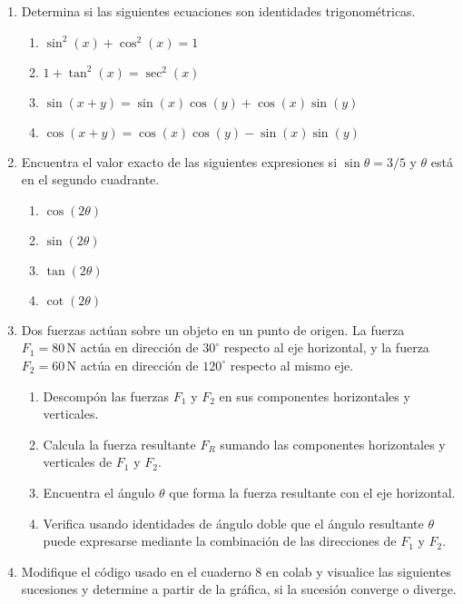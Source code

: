 \documentclass[a4paper,11pt]{article}
\theoremstyle{mytheor}
\begin{document}
\begin{enumerate}
\item
Determina si las siguientes ecuaciones son identidades trigonométricas.
\begin{enumerate}
    \item \( \sin^2(x) + \cos^2(x) = 1 \)
    \item \( 1 + \tan^2(x) = \sec^2(x) \)
    \item \( \sin(x + y) = \sin(x)\cos(y) + \cos(x)\sin(y) \)
    \item \( \cos(x + y) = \cos(x)\cos(y) - \sin(x)\sin(y) \)
\end{enumerate}

\item
Encuentra el valor exacto de las siguientes expresiones si \(\sin \theta = 3/5\) y \(\theta\) está en el segundo cuadrante.
\begin{enumerate}
    \item \( \cos(2\theta) \)
    \item \( \sin(2\theta) \)
    \item \( \tan(2\theta) \)
    \item \( \cot(2\theta) \)
\end{enumerate}

\item 

Dos fuerzas actúan sobre un objeto en un punto de origen. La fuerza \( F_1 = 80 \, \text{N} \) actúa en dirección de \( 30^\circ \) respecto al eje horizontal, y la fuerza \( F_2 = 60 \, \text{N} \) actúa en dirección de \( 120^\circ \) respecto al mismo eje.
\begin{enumerate}
    \item Descompón las fuerzas \( F_1 \) y \( F_2 \) en sus componentes horizontales y verticales.
    \item Calcula la fuerza resultante \( F_R \) sumando las componentes horizontales y verticales de \( F_1 \) y \( F_2 \).
    \item Encuentra el ángulo \( \theta \) que forma la fuerza resultante con el eje horizontal.
    \item Verifica usando identidades de ángulo doble que el ángulo resultante \( \theta \) puede expresarse mediante la combinación de las direcciones de \( F_1 \) y \( F_2 \).
    \end{enumerate}
 
\item
Modifique el código usado en el cuaderno 8 en colab y visualice las siguientes sucesiones y determine
a partir de la gráfica, si la sucesión converge o diverge.


\end{enumerate}
\end{document}
